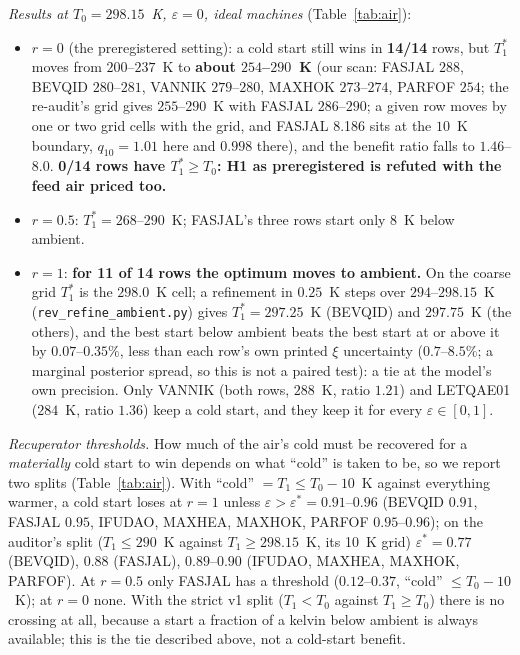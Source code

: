 \documentclass[10pt]{article}
\begin{document}
\emph{Results at $T_0=298.15$~K, $\varepsilon=0$, ideal machines} (Table~\ref{tab:air}):
\begin{itemize}\itemsep=1pt
\item $r=0$ (the preregistered setting): a cold start still wins in \textbf{14/14} rows, but $T_1^\ast$ moves from $200$--$237$~K to \textbf{about $254$--$290$~K} (our scan: FASJAL $288$, BEVQID $280$--$281$, VANNIK $279$--$280$, MAXHOK $273$--$274$, PARFOF $254$; the re-audit's grid gives $255$--$290$~K with FASJAL $286$--$290$; a given row moves by one or two grid cells with the grid, and FASJAL 8.186 sits at the $10$~K boundary, $q_{10}=1.01$ here and $0.998$ there), and the benefit ratio falls to $1.46$--$8.0$. \textbf{0/14 rows have $T_1^\ast\ge T_0$: H1 as preregistered is refuted with the feed air priced too.}
\item $r=0.5$: $T_1^\ast=268$--$290$~K; FASJAL's three rows start only $8$~K below ambient.
\item $r=1$: \textbf{for 11 of 14 rows the optimum moves to ambient.} On the coarse grid $T_1^\ast$ is the $298.0$~K cell; a refinement in $0.25$~K steps over $294$--$298.15$~K (\texttt{rev\_refine\_ambient.py}) gives $T_1^\ast=297.25$~K (BEVQID) and $297.75$~K (the others), and the best start below ambient beats the best start at or above it by $0.07$--$0.35\%$, less than each row's own printed $\xi$ uncertainty ($0.7$--$8.5\%$; a marginal posterior spread, so this is not a paired test): a tie at the model's own precision. Only VANNIK (both rows, $288$~K, ratio $1.21$) and LETQAE01 ($284$~K, ratio $1.36$) keep a cold start, and they keep it for every $\varepsilon\in[0,1]$.
\end{itemize}
\emph{Recuperator thresholds.} How much of the air's cold must be recovered for a \emph{materially} cold start to win depends on what ``cold'' is taken to be, so we report two splits (Table~\ref{tab:air}). With ``cold'' $=T_1\le T_0-10$~K against everything warmer, a cold start loses at $r=1$ unless $\varepsilon>\varepsilon^\ast=0.91$--$0.96$ (BEVQID $0.91$, FASJAL $0.95$, IFUDAO, MAXHEA, MAXHOK, PARFOF $0.95$--$0.96$); on the auditor's split ($T_1\le290$~K against $T_1\ge298.15$~K, its 10~K grid) $\varepsilon^\ast=0.77$ (BEVQID), $0.88$ (FASJAL), $0.89$--$0.90$ (IFUDAO, MAXHEA, MAXHOK, PARFOF). At $r=0.5$ only FASJAL has a threshold ($0.12$--$0.37$, ``cold'' $\le T_0-10$~K); at $r=0$ none. With the strict v1 split ($T_1<T_0$ against $T_1\ge T_0$) there is no crossing at all, because a start a fraction of a kelvin below ambient is always available; this is the tie described above, not a cold-start benefit.
\end{document}
